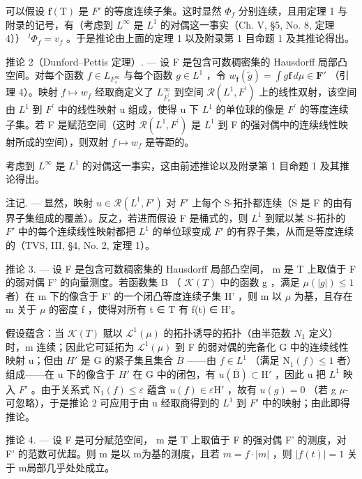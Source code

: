 可以假设 \(\mathbf{f}(\mathrm{T})\) 是 \(F'\) 的等度连续子集。这时显然 \(\Phi_{f}\) 分别连续，且用定理 1 与附录的记号，有（考虑到 \(L^{\infty}\) 是 \(L^{1}\) 的对偶这一事实（Ch. V, §5, No. 8, 定理 4）） \(^{l}\Phi_{f}=v_{f}\) 。于是推论由上面的定理 1 以及附录第 1 目命题 1 及其推论得出。

推论 2（Dunford--Pettis 定理）. --- 设 F 是包含可数稠密集的 Hausdorff 局部凸空间。对每个函数 \(f \in L_{F_{s}^{\infty}}\) 与每个函数 \(g \in L^{1}\) ，令 \(w_{\mathbf{f}}(\widetilde{g}) = \int g\mathbf{f} \, d\mu \in \mathbf{F}'\) （引理 4）。映射 \(f \mapsto w_{f}\) 经取商定义了 \(L_{F_{s}^{\prime}}^{\infty}\) 到空间 \(\mathcal{R}(L^{1}, F^{\prime})\) 上的线性双射，该空间由 \(L^{1}\) 到 \(F^{\prime}\) 中的线性映射 u 组成，使得 u 下 \(L^{1}\) 的单位球的像是 \(F^{\prime}\) 的等度连续子集。若 F 是赋范空间（这时 \(\mathcal{R}(L^{1}, F^{\prime})\) 是 \(L^{1}\) 到 F 的强对偶中的连续线性映射所成的空间），则双射 \(f \mapsto w_{f}\) 是等距的。

考虑到 \(L^{\infty}\) 是 \(L^{1}\) 的对偶这一事实，这由前述推论以及附录第 1 目命题 1 及其推论得出。

注记. --- 显然，映射 \(u \in \mathcal{R}(L^{1}, F')\) 对 \(F'\) 上每个 S-拓扑都连续（S 是 F 的由有界子集组成的覆盖）。反之，若进而假设 F 是桶式的，则 \(L^{1}\) 到赋以某 S-拓扑的 \(F'\) 中的每个连续线性映射都把 \(L^{1}\) 的单位球变成 \(F'\) 的有界子集，从而是等度连续的（TVS, III, §4, No. 2, 定理 1）。

推论 3. --- 设 F 是包含可数稠密集的 Hausdorff 局部凸空间， m 是 T 上取值于 F 的弱对偶 F' 的向量测度。若函数集 B （ \(\mathcal{K}(T)\) 中的函数 g ，满足 \(\mu(|g|) \leqslant 1\) 者）在 m 下的像含于 F' 的一个闭凸等度连续子集 H' ，则 m 以 \(\mu\) 为基，且存在 m 关于 \(\mu\) 的密度 f ，使得对所有 t ∈ T 有 f(t) ∈ H'。

假设蕴含：当 \(\mathcal{K}(T)\) 赋以 \(\mathcal{L}^{1}(\mu)\) 的拓扑诱导的拓扑（由半范数 \(N_{1}\) 定义）时，m 连续；因此它可延拓为 \(\mathcal{L}^{1}(\mu)\) 到 F 的弱对偶的完备化 G 中的连续线性映射 u；但由 \(H'\) 是 G 的紧子集且集合 \(\overline{B}\) ——由 \(f \in L^{1}\) （满足 \(\mathrm{N}_{1}(f) \leqslant 1\) 者）组成——在 u 下的像含于 \(H'\) 在 G 中的闭包，有 \(u(\overline{\mathrm{B}}) \subset \mathrm{H}'\) ，因此 u 把 \(L^{1}\) 映入 \(F'\) 。由于关系式 \(\mathrm{N}_{1}(f) \leqslant \varepsilon\) 蕴含 \(u(f) \in \varepsilon\mathrm{H}'\) ，故有 \(u(g) = 0\) （若 g \(\mu\)-可忽略），于是推论 2 可应用于由 u 经取商得到的 \(L^{1}\) 到 \(F'\) 中的映射；由此即得推论。

推论 4. --- 设 F 是可分赋范空间， m 是 T 上取值于 F 的强对偶 F' 的测度，对 F' 的范数可优超。则 m 是以 \textbar m\textbar 为基的测度，且若 \(m = f \cdot |m|\) ，则 \(|f(t)| = 1\) 关于 \textbar m\textbar 局部几乎处处成立。

